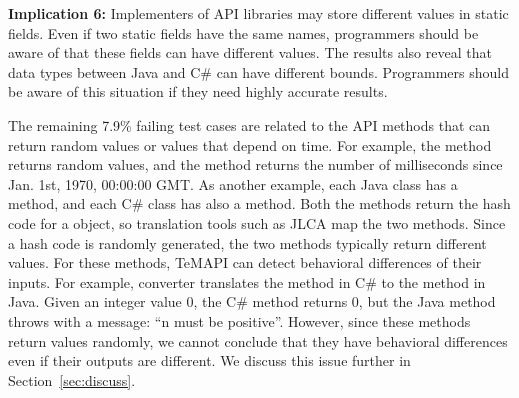 \textbf{Implication 6:} Implementers of API libraries may store different values in static fields. Even if two static fields have the same names, programmers should be aware of that these fields can have different values. The results also reveal that data types between Java and C\# can have different bounds. Programmers should be aware of this situation if they need highly accurate results.

The remaining 7.9\% failing test cases are related to the API methods that can return random values or values that depend on time. For example, the  method returns random values, and the  method returns the number of milliseconds since Jan. 1st, 1970, 00:00:00 GMT. As another example, each Java class has a  method, and each C\# class has also a  method. Both the methods return the hash code for a object, so translation tools such as JLCA map the two methods. Since a hash code is randomly generated, the two methods typically return different values. For these methods, TeMAPI can detect behavioral differences of their inputs. For example, converter translates the  method in C\# to the  method in Java. Given an integer value 0, the C\# method returns 0, but the Java method throws  with a message: ``n must be positive''. However, since these methods return values randomly, we cannot conclude that they have behavioral differences even if their outputs are different. We discuss this issue further in Section~\ref{sec:discuss}.

